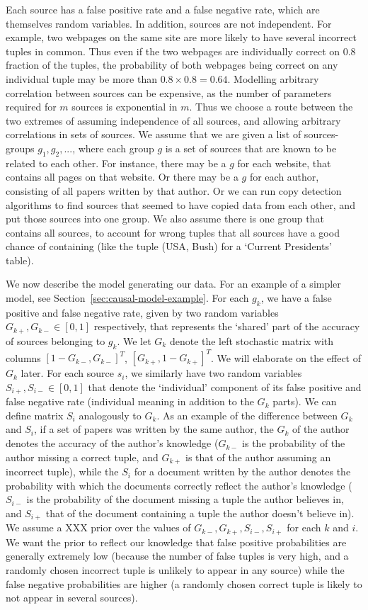 \documentclass{sig-alternate}
\newcounter{prob}
\begin{document}
Each source has a false positive rate and a false negative rate, which are themselves random variables. In addition, sources are not independent. For example, two webpages on the same site are more likely to have several incorrect tuples in common. Thus even if the two webpages are individually correct on $0.8$ fraction of the tuples, the probability of both webpages being correct on any individual tuple may be more than $0.8 \times 0.8 = 0.64$. Modelling arbitrary correlation between sources can be expensive, as the number of parameters required for $m$ sources is exponential in $m$. Thus we choose a route between the two extremes of assuming independence of all sources, and allowing arbitrary correlations in sets of sources. We assume that we are given a list of sources-groups $g_1, g_2, ...$, where each group $g$ is a set of sources that are known to be related to each other. For instance, there may be a $g$ for each website, that contains all pages on that website. Or there may be a $g$ for each author, consisting of all papers written by that author. Or we can run copy detection algorithms to find sources that seemed to have copied data from each other, and put those sources into one group. We also assume there is one group that contains all sources, to account for wrong tuples that all sources have a good chance of containing (like the tuple (USA, Bush) for a `Current Presidents' table).

We now describe the model generating our data. For an example of a simpler model, see Section~\ref{sec:causal-model-example}. For each $g_k$, we have a false positive and false negative rate, given by two random variables $G_{k+},G_{k-} \in [0,1]$ respectively, that represents the `shared' part of the accuracy of sources belonging to $g_k$. We let $G_k$ denote the left stochastic matrix with columns $[1-G_{k-},G_{k-}]^T$, $[G_{k+},1-G_{k+}]^T$. We will elaborate on the effect of $G_k$ later. For each source $s_i$, we similarly have two random variables $S_{i+},S_{i-} \in [0,1]$ that denote the `individual' component of its false positive and false negative rate (individual meaning in addition to the $G_k$ parts). We can define matrix $S_i$ analogously to $G_k$. As an example of the difference between $G_k$ and $S_i$, if a set of papers was written by the same author, the $G_k$ of the author denotes the accuracy of the author's knowledge ($G_{k-}$ is the probability of the author missing a correct tuple, and $G_{k+}$ is that of the author assuming an incorrect tuple), while the $S_i$ for a document written by the author denotes the probability with which the documents correctly reflect the author's knowledge ($S_{i-}$ is the probability of the document missing a tuple the author believes in, and $S_{i+}$ that of the document containing a tuple the author doesn't believe in). We assume a XXX prior over the values of $G_{k-}, G_{k+}, S_{i-}, S_{i+}$ for each $k$ and $i$. We want the prior to reflect our knowledge that false positive probabilities are generally extremely low (because the number of false tuples is very high, and a randomly chosen incorrect tuple is unlikely to appear in any source) while the false negative probabilities are higher (a randomly chosen correct tuple is likely to not appear in several sources).
\end{document}

